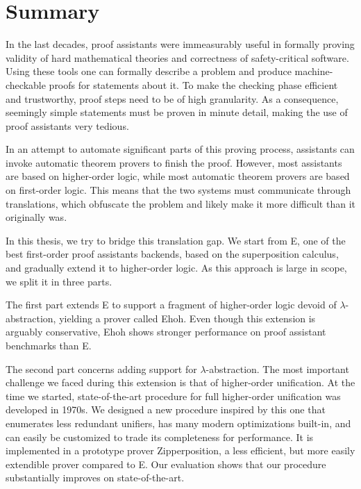 \chapter*{Summary}

In the last decades, proof assistants were immeasurably useful in formally
proving validity of hard mathematical theories and correctness of
safety-critical software. Using these tools one can formally describe a problem
and produce machine-checkable proofs for statements about it. To make the
checking phase efficient and trustworthy, proof steps need to be of high
granularity. As a consequence, seemingly simple statements must be proven in
minute detail, making the use of proof assistants very tedious.

In an attempt to automate significant parts of this proving process, assistants
can invoke automatic theorem provers to finish the proof. However, most
assistants are based on higher-order logic, while most automatic theorem provers
are based on first-order logic. This means that the two systems must communicate
through translations, which obfuscate the problem and likely make it more
difficult than it originally was.

In this thesis, we try to bridge this translation gap. We start from E, one of the best
first-order proof assistants backends, based on the superposition calculus, and
gradually extend it to higher-order logic. As this approach is large in scope,
we split it in three parts.

The first part extends E to support a fragment of higher-order logic devoid of
$\lambda$-abstra\-ction, yielding a prover called Ehoh. Even though this extension
is arguably conservative, Ehoh shows stronger performance on proof assistant
benchmarks than E.

The second part concerns adding support for $\lambda$-abstraction. The most
important challenge we faced during this extension is that of higher-order
unification. At the time we started, state-of-the-art procedure
for full higher-order unification was developed in 1970s. We designed a new
procedure inspired by this one that enumerates less redundant unifiers, has many
modern optimizations built-in, and can easily be customized to trade its
completeness for performance. It is implemented in a
prototype prover Zipperposition, a less efficient, but more easily extendible
prover compared to E. Our evaluation shows that our
procedure substantially improves on state-of-the-art.

